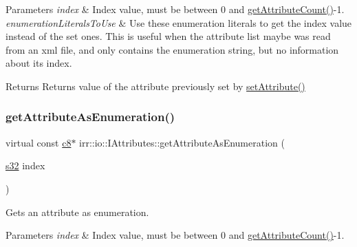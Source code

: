 \begin{DoxyParams}{Parameters}
{\em index} & Index value, must be between 0 and \hyperlink{classirr_1_1io_1_1IAttributes_a796bdd9440ee7ba0b6742a90a82870b6}{get\+Attribute\+Count()}-\/1. \\
\hline
{\em enumeration\+Literals\+To\+Use} & Use these enumeration literals to get the index value instead of the set ones. This is useful when the attribute list maybe was read from an xml file, and only contains the enumeration string, but no information about its index. \\
\hline
\end{DoxyParams}
\begin{DoxyReturn}{Returns}
Returns value of the attribute previously set by \hyperlink{classirr_1_1io_1_1IAttributes_a03fa31acb481ae23678676cc183f09a6}{set\+Attribute()} 
\end{DoxyReturn}
\mbox{\label{classirr_1_1io_1_1IAttributes_a195cd7ee6a50a6a10d22a874072a93c9}} 
\subsubsection{\texorpdfstring{get\+Attribute\+As\+Enumeration()}{getAttributeAsEnumeration()}\hspace{0.1cm}{\footnotesize\ttfamily [7/8]}}
{\footnotesize\ttfamily virtual const \hyperlink{namespaceirr_a9395eaea339bcb546b319e9c96bf7410}{c8}$\ast$ irr\+::io\+::\+I\+Attributes\+::get\+Attribute\+As\+Enumeration (\begin{DoxyParamCaption}\item[{\hyperlink{namespaceirr_ac66849b7a6ed16e30ebede579f9b47c6}{s32}}]{index }\end{DoxyParamCaption})\hspace{0.3cm}{\ttfamily [pure virtual]}}



Gets an attribute as enumeration. 


\begin{DoxyParams}{Parameters}
{\em index} & Index value, must be between 0 and \hyperlink{classirr_1_1io_1_1IAttributes_a796bdd9440ee7ba0b6742a90a82870b6}{get\+Attribute\+Count()}-\/1. \\
\hline
\end{DoxyParams}
\mbox{\label{classirr_1_1io_1_1IAttributes_a195cd7ee6a50a6a10d22a874072a93c9}} 
